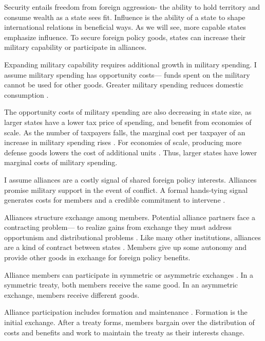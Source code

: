 \documentclass[12pt]{article}
\begin{document}
Security entails freedom from foreign aggression- the ability to hold territory and consume wealth as a state sees fit. 
Influence is the ability of a state to shape international relations in beneficial ways. 
As we will see, more capable states emphasize influence. 
To secure foreign policy goods, states can increase their military capability or participate in alliances. 


Expanding military capability requires additional growth in military spending. 
I assume military spending has opportunity costs--- funds spent on the military cannot be used for other goods. 
Greater military spending reduces domestic consumption \citep{Fearon2018}. 

The opportunity costs of military spending are also decreasing in state size, as larger states have a lower tax price of spending, and benefit from economies of scale. 
As the number of taxpayers falls, the marginal cost per taxpayer of an increase in military spending rises \citep{DudleyMontmarquette1981}. 
For economies of scale, producing more defense goods lowers the cost of additional units \citep{Moravcsik1991, AlesinaSpolaore2006}. 
Thus, larger states have lower marginal costs of military spending. 


I assume alliances are a costly signal of shared foreign policy interests. 
Alliances promise military support in the event of conflict. 
A formal hands-tying signal generates costs for members and a credible commitment to intervene \citep{Fearon1997, Leeds2003}.


Alliances structure exchange among members. 
Potential alliance partners face a contracting problem--- to realize gains from exchange they must address opportunism and distributional problems \citep{Williamson1985, Koremenosetal2001}. 
Like many other institutions, alliances are a kind of contract between states \citep{Lake1996, Bensonetal2014}. 
Members give up some autonomy and provide other goods in exchange for foreign policy benefits. 


Alliance members can participate in symmetric or asymmetric exchanges \citet{Morrow1991}.
In a symmetric treaty, both members receive the same good. 
In an asymmetric exchange, members receive different goods.  


Alliance participation includes formation and maintenance \citep{Snyder1997}. 
Formation is the initial exchange. 
After a treaty forms, members bargain over the distribution of costs and benefits and work to maintain the treaty as their interests change. 
\end{document}
